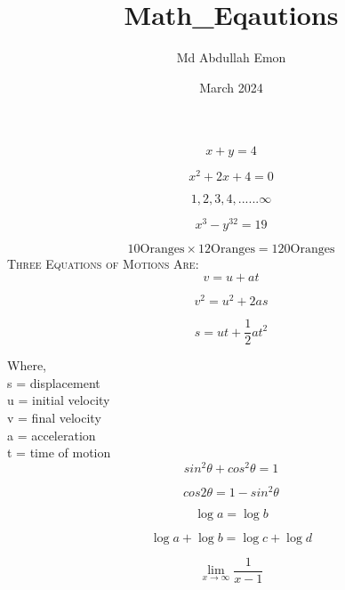 \documentclass{article}
\title{Math_Eqautions}
\author{Md Abdullah Emon}
\date{March 2024}
\begin{document}
\begin{equation}
    x+y=4
\end{equation}


\begin{equation}
    x^2+2x+4=0
\end{equation}


\begin{equation}
    1,2,3,4,......\infty
\end{equation}


\begin{equation}
    x^3-y^{32}=19
\end{equation}


\begin{equation}
    10\text{Oranges} \times 12\text{Oranges}=120\text{Oranges}
\end{equation}
\textsc{Three Equations of Motions Are: }
\begin{equation}
    v=u+at
\end{equation}

\begin{equation}
    v^2=u^2+2as
\end{equation}

\begin{equation}
    s=ut+\frac{1}{2}at^2
\end{equation}

Where,\\
s = displacement\\
u = initial velocity \\
v = final velocity \\
a = acceleration \\
t = time of motion \\


\begin{equation}
    sin^2\theta+cos^2\theta=1
\end{equation}

\begin{equation}
    cos2\theta= 1-sin^2\theta
\end{equation}

\begin{equation}
    \log a=\log b
\end{equation}

\begin{equation}
    \log a + \log b=\log c + \log d
\end{equation}

\begin{equation}
    \lim_{x\to\infty}\frac{1}{x-1}
\end{equation}
\end{document}
